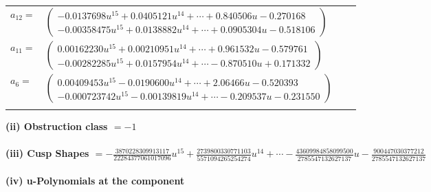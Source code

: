 \documentclass[1p]{elsarticle_modified}
\theoremstyle{definition}
\begin{document}
\begin{tabular}{m{7pt} m{180pt} m{7pt} m{180pt} }
\flushright $a_{12}=$&$\begin{pmatrix}-0.0137698 u^{15}+0.0405121 u^{14}+\cdots+0.840506 u-0.270168\\-0.00358475 u^{15}+0.0138882 u^{14}+\cdots+0.0905304 u-0.518106\end{pmatrix}$ \\
\flushright $a_{11}=$&$\begin{pmatrix}0.00162230 u^{15}+0.00210951 u^{14}+\cdots+0.961532 u-0.579761\\-0.00282285 u^{15}+0.0157954 u^{14}+\cdots-0.870510 u+0.171332\end{pmatrix}$ \\
\flushright $a_{6}=$&$\begin{pmatrix}0.00409453 u^{15}-0.0190600 u^{14}+\cdots+2.06466 u-0.520393\\-0.000723742 u^{15}-0.00139819 u^{14}+\cdots-0.209537 u-0.231550\end{pmatrix}$\\&\end{tabular}
\flushleft \textbf{(ii) Obstruction class $= -1$}\\~\\
\flushleft \textbf{(iii) Cusp Shapes $= -\frac{3870228309913117}{22284377061017096} u^{15}+\frac{2739800330771103}{5571094265254274} u^{14}+\cdots-\frac{43609984858099500}{2785547132627137} u-\frac{900447030377212}{2785547132627137}$}\\~\\
\newpage\renewcommand{\arraystretch}{1}
\flushleft \textbf{(iv) u-Polynomials at the component}\newline \\
\end{document}
